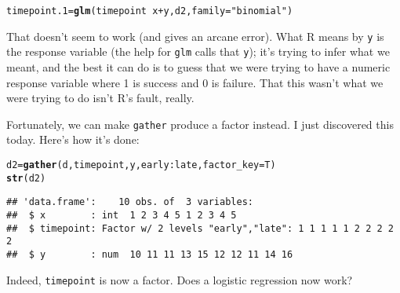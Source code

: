 \documentclass{article}\usepackage[]{graphicx}\usepackage[]{color}
\makeatletter
\newcommand{\hlstr}[1]{\textcolor[rgb]{0.192,0.494,0.8}{#1}}%
\newcommand{\hlopt}[1]{\textcolor[rgb]{0,0,0}{#1}}%
\newcommand{\hlstd}[1]{\textcolor[rgb]{0.345,0.345,0.345}{#1}}%
\newcommand{\hlkwb}[1]{\textcolor[rgb]{0.69,0.353,0.396}{#1}}%
\newcommand{\hlkwc}[1]{\textcolor[rgb]{0.333,0.667,0.333}{#1}}%
\newcommand{\hlkwd}[1]{\textcolor[rgb]{0.737,0.353,0.396}{\textbf{#1}}}%
\newenvironment{kframe}{%
 \def\at@end@of@kframe{}%
 \ifinner\ifhmode%
  \def\at@end@of@kframe{\end{minipage}}%
  \begin{minipage}{\columnwidth}%
 \fi\fi%
 \def\FrameCommand##1{\hskip\@totalleftmargin \hskip-\fboxsep
 \colorbox{shadecolor}{##1}\hskip-\fboxsep
     \hskip-\linewidth \hskip-\@totalleftmargin \hskip\columnwidth}%
 \MakeFramed {\advance\hsize-\width
   \@totalleftmargin\z@ \linewidth\hsize
   \@setminipage}}%
 {\par\unskip\endMakeFramed%
 \at@end@of@kframe}
\newenvironment{knitrout}{}{} %
\makeatother
\begin{document}
\begin{knitrout}
\color{fgcolor}\begin{kframe}
\begin{alltt}
\hlstd{timepoint.1}\hlkwb{=}\hlkwd{glm}\hlstd{(timepoint}\hlopt{~}\hlstd{x}\hlopt{+}\hlstd{y,d2,}\hlkwc{family}\hlstd{=}\hlstr{"binomial"}\hlstd{)}
\end{alltt}


{\ttfamily\noindent\bfseries\color{errorcolor}{\#\# Error in eval(expr, envir, enclos): y values must be 0 <= y <= 1}}\end{kframe}
\end{knitrout}
That doesn't seem to work (and gives an arcane error). What R means by
\texttt{y} is the response variable (the help for \texttt{glm} calls
that \texttt{y}); it's trying to infer what we meant, and the best it
can do is to guess that we were trying to have a numeric response
variable where 1 is success and 0 is failure. That this wasn't what we
were trying to do isn't R's fault, really.

Fortunately, we can make \texttt{gather} produce a factor instead. I
just discovered this today. Here's how it's done:

\begin{knitrout}
\color{fgcolor}\begin{kframe}
\begin{alltt}
\hlstd{d2}\hlkwb{=}\hlkwd{gather}\hlstd{(d,timepoint,y,early}\hlopt{:}\hlstd{late,}\hlkwc{factor_key}\hlstd{=T)}
\hlkwd{str}\hlstd{(d2)}
\end{alltt}
\begin{verbatim}
## 'data.frame':	10 obs. of  3 variables:
##  $ x        : int  1 2 3 4 5 1 2 3 4 5
##  $ timepoint: Factor w/ 2 levels "early","late": 1 1 1 1 1 2 2 2 2 2
##  $ y        : num  10 11 11 13 15 12 12 11 14 16
\end{verbatim}
\end{kframe}
\end{knitrout}

Indeed, \texttt{timepoint} is now a factor. Does a logistic regression
now work?
\end{document}
